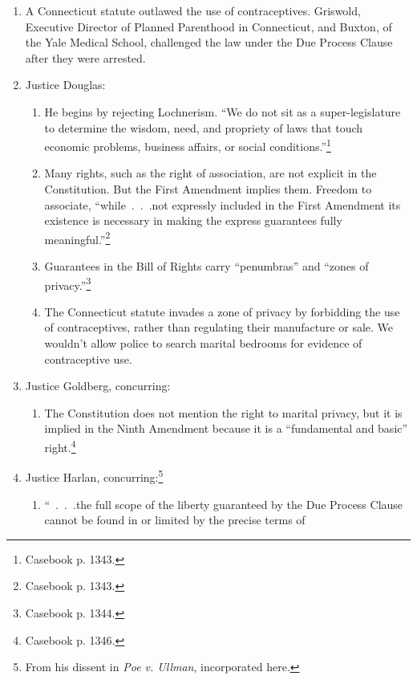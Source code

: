 \begin{enumerate}
    \item A Connecticut statute outlawed the use of contraceptives. Griswold, 
    Executive Director of Planned Parenthood in Connecticut, and Buxton, of 
    the Yale Medical School, challenged the law under the Due Process Clause 
    after they were arrested.
    \item Justice Douglas:
    \begin{enumerate}
        \item He begins by rejecting Lochnerism. ``We do not sit as a 
        super-legislature to determine the wisdom, need, and propriety of laws 
        that touch economic problems, business affairs, or social 
        conditions.''\footnote{Casebook p. 1343.}
        \item Many rights, such as the right of association, are not explicit 
        in the Constitution. But the First Amendment implies them. Freedom to 
        associate, ``while~.~.~.not expressly included in the First Amendment 
        its existence is necessary in making the express guarantees fully 
        meaningful.''\footnote{Casebook p. 1343.}
        \item Guarantees in the Bill of Rights carry ``penumbras'' and ``zones 
        of privacy.''\footnote{Casebook p. 1344.}
        \item The Connecticut statute invades a zone of privacy by forbidding 
        the use of contraceptives, rather than regulating their manufacture or 
        sale. We wouldn't allow police to search marital bedrooms for evidence 
        of contraceptive use.
    \end{enumerate}
    \item Justice Goldberg, concurring:
    \begin{enumerate}
        \item The Constitution does not mention the right to marital privacy, 
        but it is implied in the Ninth Amendment because it is a ``fundamental 
        and basic'' right.\footnote{Casebook p. 1346.}
    \end{enumerate}
    \item Justice Harlan, concurring:\footnote{From his dissent in \emph{Poe 
    v. Ullman}, incorporated here.}
    \begin{enumerate}
        \item ``~.~.~.the full scope of the liberty guaranteed by the Due 
        Process Clause cannot be found in or limited by the precise terms of 

\end{enumerate}
\end{enumerate}
